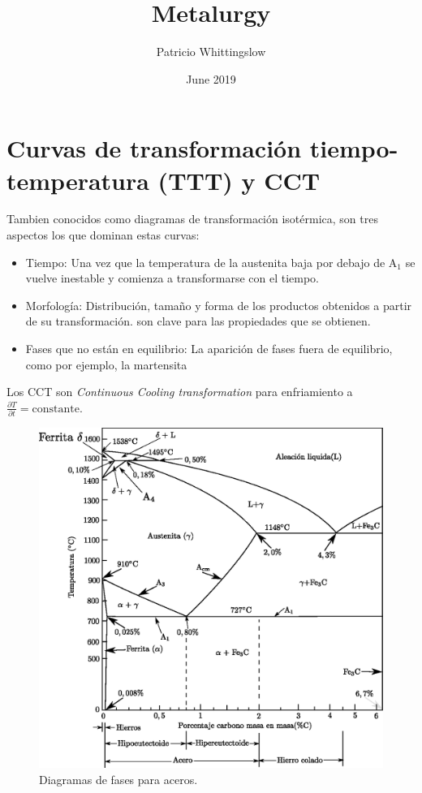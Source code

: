 \documentclass{article}
\title{Metalurgy}
\author{Patricio Whittingslow}
\date{June 2019}
\begin{document}
\maketitle

\part{Curvas de transformación tiempo-temperatura (TTT) y CCT}
Tambien conocidos como diagramas de transformación isotérmica, son tres aspectos los que dominan estas curvas:
\begin{itemize}
    \item Tiempo: Una vez que la temperatura de la austenita baja por debajo de A$_1$ se vuelve inestable y comienza a transformarse con el tiempo. 
    \item Morfología: Distribución, tamaño y forma de los productos obtenidos a partir de su transformación. son clave para las propiedades que se obtienen.
    \item Fases que no están en equilibrio: La aparición de fases fuera de equilibrio, como por ejemplo, la martensita
\end{itemize}
Los CCT son \textit{Continuous Cooling transformation} para enfriamiento a $\frac{\partial T}{\partial t}= \text{constante}$.


\begin{figure}[ht]
    \centering
    \includegraphics[width=1\textwidth]{fig/diagAceroreal.eps}
    \caption{Diagramas de fases para aceros.}
    \label{fig:diagAceros}
\end{figure}
\end{document}
